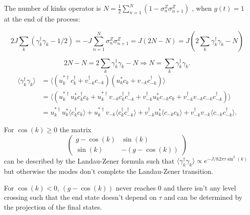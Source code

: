 \documentclass{article}
\begin{document}
The number of kinks operator is \(N = \frac{1}{2} \sum_{n=1}^N (1 - \sigma_n^Z \sigma_{n+1}^Z)\) , when \(g(t)=1\) at the end of the process:

\[
    2J\sum_k (\gamma_k^\dagger \gamma_k - 1/2) = -J\sum_{n=1}^N \sigma_n^Z \sigma_{n+1}^Z = J(2N - N) = J(2\sum_k \gamma_k^\dagger \gamma_k - N)
\]

\[
    2N - N = 2\sum_k \gamma_k^\dagger \gamma_k - N \Rightarrow N = \sum_k \gamma_k^\dagger \gamma_k.
\]
\begin{align*}
    \langle \gamma_k^\dagger \gamma_k \rangle & = \langle (u_k^{* \dagger} c_k^\dagger + v_{-k}^\dagger c_{-k})(u_k^* c_k + v_{-k} c_{-k}^\dagger) \rangle                                                                                                                                   \\
                                              & = \langle (u_k^{* \dagger} u_k^* c_k^\dagger c_k + u_k^{* \dagger} v_{-k} c_k^\dagger c_{-k}^\dagger + v_{-k}^\dagger u_k^* c_{-k} c_k + v_{-k}^\dagger v_{-k} c_{-k} c_{-k}^\dagger) \rangle                                                \\
                                              & = u_k^{* \dagger} u_k^* \langle c_k^\dagger c_k \rangle + u_k^{* \dagger} v_{-k} \langle c_k^\dagger c_{-k}^\dagger \rangle + v_{-k}^\dagger u_k^* \langle c_{-k} c_k \rangle + v_{-k}^\dagger v_{-k} \langle c_{-k} c_{-k}^\dagger \rangle.
\end{align*}

For \( \cos(k) \geq 0 \) the matrix
\[
    \begin{pmatrix}
        g - \cos(k) & \sin(k)        \\
        \sin(k)     & -(g - \cos(k))
    \end{pmatrix}
\]
can be described by the Landau-Zener formula such that \( \langle \gamma_k^\dagger \gamma_k \rangle \propto e^{-J/\hbar 2\pi\tau \sin^2(k)} \) but otherwise the modes don't complete the Landau-Zener transition.

For \( \cos(k) < 0 \), \( (g - \cos(k)) \) never reaches 0 and there isn't any level crossing such that the end state doesn’t depend on \( \tau \) and can be determined by the projection of the final states.
\end{document}
